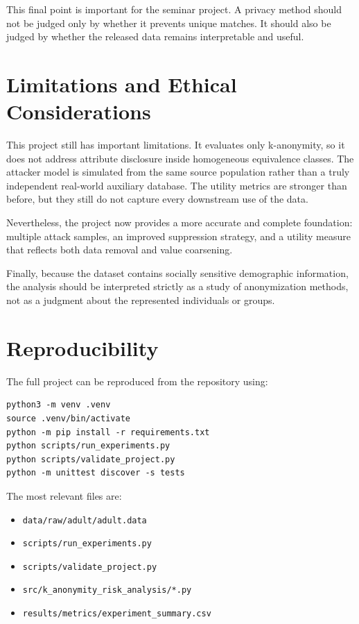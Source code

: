 \documentclass[11pt]{article}
\begin{document}
This final point is important for the seminar project. A privacy method should not be judged only by whether it prevents unique matches. It should also be judged by whether the released data remains interpretable and useful.

\section{Limitations and Ethical Considerations}
This project still has important limitations. It evaluates only k-anonymity, so it does not address attribute disclosure inside homogeneous equivalence classes. The attacker model is simulated from the same source population rather than a truly independent real-world auxiliary database. The utility metrics are stronger than before, but they still do not capture every downstream use of the data.

Nevertheless, the project now provides a more accurate and complete foundation: multiple attack samples, an improved suppression strategy, and a utility measure that reflects both data removal and value coarsening.

Finally, because the dataset contains socially sensitive demographic information, the analysis should be interpreted strictly as a study of anonymization methods, not as a judgment about the represented individuals or groups.

\section{Reproducibility}
The full project can be reproduced from the repository using:
\begin{verbatim}
python3 -m venv .venv
source .venv/bin/activate
python -m pip install -r requirements.txt
python scripts/run_experiments.py
python scripts/validate_project.py
python -m unittest discover -s tests
\end{verbatim}

The most relevant files are:
\begin{itemize}[leftmargin=*]
    \item \texttt{data/raw/adult/adult.data}
    \item \texttt{scripts/run\_experiments.py}
    \item \texttt{scripts/validate\_project.py}
    \item \texttt{src/k\_anonymity\_risk\_analysis/*.py}
    \item \texttt{results/metrics/experiment\_summary.csv}
\end{itemize}
\end{document}
